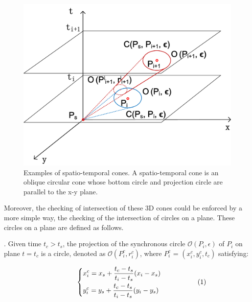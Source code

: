 \begin{figure}[tb!]
\centering
\includegraphics[scale=0.6]{figures/Fig-cis.png}
\caption{\small Examples of spatio-temporal cones. A spatio-temporal cone is an oblique circular cone whose bottom circle and projection circle are parallel to the x-y plane. }
\vspace{-2ex}
\label{fig:cis}
\end{figure}

Moreover, the checking of intersection of these 3D cones could be enforced by a more simple way, \ie the checking of the intersection of circles on a plane. These circles on a plane are defined as follows.

. Given time $t_c > t_s$, the projection of the synchronous circle $\mathcal{O}(P_i, \epsilon)$ of $P_i$ on plane $t=t_c$ is a circle, denoted as $\mathcal{O}(P^c_i, r^c_i)$, where $P^c_i$ =  $(x^c_i, y^c_i, t_c)$ satisfying:


\vspace{-1ex}
\begin{equation*}
\label{equ-proj-circle-xy}
\hspace{10ex} \left\{
    \begin{aligned}
        & x^c_i = x_s +  \frac{t_c - t_s}{t_i - t_s}(x_i - x_s) \\
        & y^c_i = y_s +  \frac{t_c - t_s}{t_i - t_s}(y_i - y_s) \\
    \end{aligned}
    \right.       \hspace{12ex}(1)
\end{equation*}
\vspace{-1ex}


